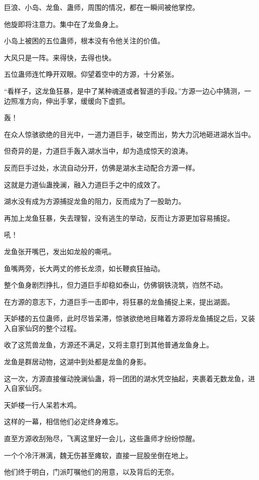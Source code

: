 \begin{this_body}
巨浪、小岛、龙鱼、蛊师，周围的情况，都在一瞬间被他掌控。

他旋即将注意力。集中在了龙鱼身上。

小岛上被困的五位蛊师，根本没有令他关注的价值。

大风只是一阵。来得快，去得也快。

五位蛊师连忙睁开双眼。仰望着空中的方源，十分紧张。

“看样子，这龙鱼狂暴，是中了某种魂道或者智道的手段。”方源一边心中猜测，一边照准方向，伸出手掌，缓缓向下虚抓。

轰！

在众人惊骇欲绝的目光中，一道力道巨手，破空而出，势大力沉地砸进湖水当中。

但奇异的是，力道巨手轰入湖水当中，却为造成惊天的浪涛。

反而巨手过处，水流自动分开，仿佛是湖水主动配合方源一样。

这就是力道仙蛊挽澜，融入力道巨手之中的成效了。

湖水没有成为方源捕捉龙鱼的阻力，反而成为了一股助力。

再加上龙鱼狂暴，失去理智，没有逃生的举动，反而让方源更加容易捕捉。

吼！

龙鱼张开嘴巴，发出如龙般的嘶吼。

鱼嘴两旁，长大两丈的修长龙须，如长鞭疯狂抽动。

整个鱼身剧烈挣扎，但力道巨手却稳如泰山，仿佛钢铁浇筑，岿然不动。

在方源的意志下，力道巨手一击即中，将狂暴的龙鱼捕捉上来，提出湖面。

天妒楼的五位蛊师，此时尽皆呆滞，惊骇欲绝地目睹着方源将龙鱼捕捉之后，又装入自家仙窍的整个过程。

收了这荒兽龙鱼，方源还不满足，又将主意打到其他普通龙鱼身上。

龙鱼是群居动物，这湖中到处都是龙鱼的身影。

这一次，方源直接催动挽澜仙蛊，将一团团的湖水凭空抽起，夹裹着无数龙鱼，进入自家仙窍。

天妒楼一行人呆若木鸡。

这样的一幕，相信他们必定终身难忘。

直至方源收刮殆尽，飞离这里好一会儿，这些蛊师才纷纷惊醒。

一个个冷汗淋漓，魏无伤甚至瘫软，直接一屁股坐倒在地上。

他们终于明白，门派叮嘱他们的用意，以及背后的无奈。


\end{this_body}

